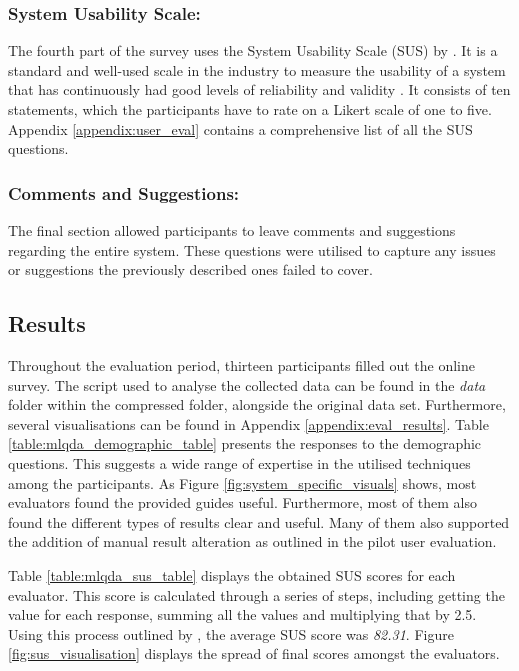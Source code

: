 \documentclass{l4proj}
\begin{document}
\subsubsection{System Usability Scale: } The fourth part of the survey uses the System Usability Scale (SUS) by \cite{brooke1996sus}. It is a standard and well-used scale in the industry to measure the usability of a system that has continuously had good levels of reliability and validity \citep{lewis2018system}. It consists of ten statements, which the participants have to rate on a Likert scale of one to five. Appendix \ref{appendix:user_eval} contains a comprehensive list of all the SUS questions.

\subsubsection{Comments and Suggestions: } The final section allowed participants to leave comments and suggestions regarding the entire system. These questions were utilised to capture any issues or suggestions the previously described ones failed to cover.

\subsection{Results}
Throughout the evaluation period, thirteen participants filled out the online survey. The script used to analyse the collected data can be found in the \textit{data} folder within the compressed folder, alongside the original data set. Furthermore, several visualisations can be found in Appendix \ref{appendix:eval_results}. Table \ref{table:mlqda_demographic_table} presents the responses to the demographic questions. This suggests a wide range of expertise in the utilised techniques among the participants. As Figure \ref{fig:system_specific_visuals} shows, most evaluators found the provided guides useful. Furthermore, most of them also found the different types of results clear and useful. Many of them also supported the addition of manual result alteration as outlined in the pilot user evaluation.

Table \ref{table:mlqda_sus_table} displays the obtained SUS scores for each evaluator. This score is calculated through a series of steps, including getting the value for each response, summing all the values and multiplying that by 2.5. Using this process outlined by \cite{brooke1996sus}, the average SUS score was \textit{82.31}. Figure \ref{fig:sus_visualisation} displays the spread of final scores amongst the evaluators.
\end{document}
